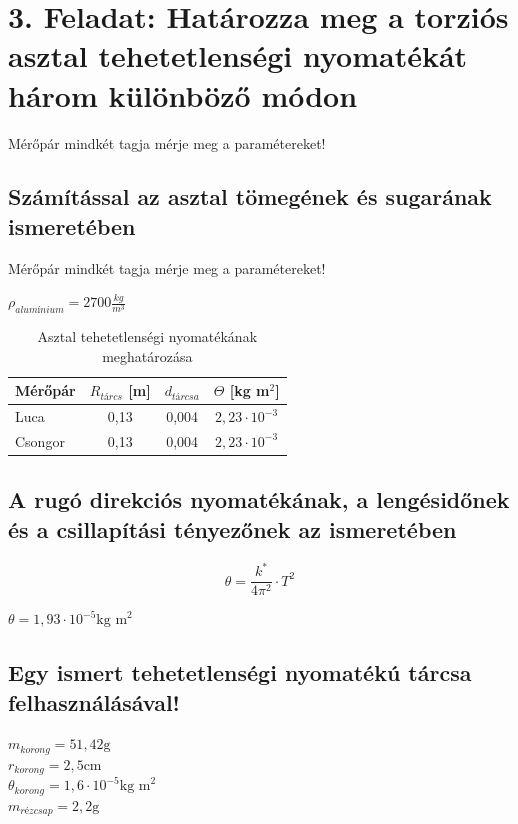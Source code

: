 \documentclass{article}
\begin{document}
\section*{3. Feladat: Határozza meg a torziós asztal tehetetlenségi nyomatékát három különböző módon}

Mérőpár mindkét tagja mérje meg a paramétereket!

\renewcommand{\thesubsection}{\alph{subsection})} %
\subsection{Számítással az asztal tömegének és sugarának ismeretében}

Mérőpár mindkét tagja mérje meg a paramétereket!

$\rho_{alumínium} = 2700 \frac{kg}{m^3}$

\begin{table}[H]
    \centering
    \renewcommand{\arraystretch}{1.2}
    \begin{tabular}{|l|c|c|c|}
        \hline
        Mérőpár & $R_{tárcs}$ [m] & $d_{tárcsa}$ & $\Theta$ [kg m$^2$] \\ \hline
        Luca& 0,13 & 0,004 & $2,23 \cdot 10^{-3}$\\ \hline
        Csongor& 0,13 & 0,004 & $2,23 \cdot 10^{-3}$\\ \hline
    \end{tabular}
    \caption{Asztal tehetetlenségi nyomatékának meghatározása}
    \label{tab:hotan_2}
\end{table}


\subsection{A rugó direkciós nyomatékának, a lengésidőnek és a csillapítási tényezőnek az ismeretében}

\[
\theta = \frac{k^*}{4\pi^2} \cdot T^2
\]

$\theta= 1,93 \cdot 10^{-5} \text{kg m}^2$

\subsection{Egy ismert tehetetlenségi nyomatékú tárcsa felhasználásával!}

$m_{korong} = 51,42 \text{g}$ \\
$r_{korong} = 2,5 \text{cm}$ \\
$\theta_{korong} = 1,6 \cdot 10^{-5} \text{kg m}^2$ \\
$m_{rézcsap} = 2,2 \text{g}$
\end{document}
